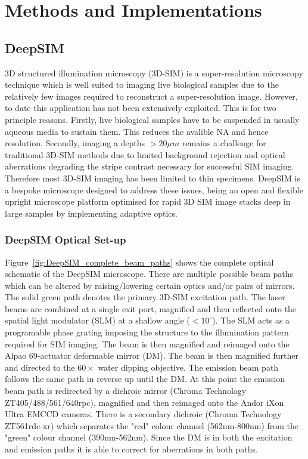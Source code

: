 \chapter{Methods and Implementations}

\section{DeepSIM}
\label{sec:DeepSIM}

3D structured illumination microscopy (3D-SIM) is a super-resolution microscopy technique which is well suited to imaging live biological samples due to the relatively few images required to reconstruct a super-resolution image. However, to date this application has not been extensively exploited. This is for two principle reasons. Firstly, live biological samples have to be suspended in usually aqueous  media to sustain them. This reduces the avalible NA and hence resolution. Secondly, imaging a depths $>20\mu m$ remains a challenge for traditional 3D-SIM methods due to limited background rejection and optical aberrations degrading the stripe contrast necessary for successful SIM imaging.\cite{wu2018faster} Therefore most 3D-SIM imaging has been limited to thin specimens. DeepSIM is a bespoke microscope designed to address these issues, being an open and flexible upright microscope platform optimised for rapid 3D SIM image stacks deep in large samples by implementing adaptive optics. 

\subsection{DeepSIM Optical Set-up}
\label{subsec:DeepSIM_optics}

Figure~\ref{fig:DeepSIM_complete_beam_paths} shows the complete optical schematic of the DeepSIM microscope. There are multiple possible beam paths which can be altered by raising/lowering certain optics and/or pairs of mirrors. The solid green path denotes the primary 3D-SIM excitation path. The laser beams are combined at a single exit port, magnified and then reflected onto the spatial light modulator (SLM) at a shallow angle ($<10^{\circ}$). The SLM acts as a programable phase grating imposing the structure to the illumination pattern required for SIM imaging. The beam is then magnified and reimaged onto the Alpao 69-actuator deformable mirror (DM). The beam is then magnified further and directed to the $60\times$ water dipping objective. The emission beam path follows the same path in reverse up until the DM. At this point the emission beam path is redirected by a dichroic mirror (Chroma Technology ZT405/488/561/640rpc), magnified and then reimaged onto the Andor iXon Ultra EMCCD cameras. There is a secondary dichroic (Chroma Technology ZT561rdc-xr) which separates the "red" colour channel (562nm-800nm) from the "green" colour channel (390nm-562nm). Since the DM is in both the excitation and emission paths it is able to correct for aberrations in both paths.

